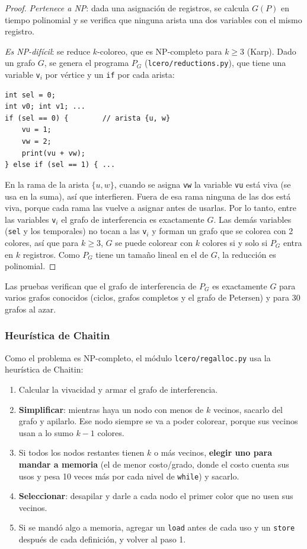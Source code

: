 \documentclass[11pt,a4paper]{article}
\theoremstyle{definition}
\newcommand{\tm}[1]{\texttt{#1}}
\renewcommand{\paragraph}[1]{\subsubsection*{#1}}
\begin{document}
\begin{proof}
\emph{Pertenece a NP}: dada una asignación de registros, se calcula $G(P)$
en tiempo polinomial y se verifica que ninguna arista una dos variables con
el mismo registro.

\emph{Es NP-difícil}: se reduce $k$-coloreo, que es NP-completo para
$k \ge 3$ (Karp). Dado un grafo $G$, se genera el programa $P_G$
(\tm{lcero/reductions.py}), que tiene una variable \tm{v}$_i$ por vértice y
un \tm{if} por cada arista:

\begin{Verbatim}
int sel = 0;
int v0; int v1; ...
if (sel == 0) {        // arista {u, w}
    vu = 1;
    vw = 2;
    print(vu + vw);
} else if (sel == 1) { ...
\end{Verbatim}

En la rama de la arista $\{u, w\}$, cuando se asigna \tm{vw} la variable
\tm{vu} está viva (se usa en la suma), así que interfieren. Fuera de esa
rama ninguna de las dos está viva, porque cada rama las vuelve a asignar
antes de usarlas. Por lo tanto, entre las variables \tm{v}$_i$ el grafo de
interferencia es exactamente $G$. Las demás variables (\tm{sel} y los
temporales) no tocan a las \tm{v}$_i$ y forman un grafo que se colorea con
2 colores, así que para $k \ge 3$, $G$ se puede colorear con $k$ colores si
y solo si $P_G$ entra en $k$ registros. Como $P_G$ tiene un tamaño lineal en
el de $G$, la reducción es polinomial.
\end{proof}

Las pruebas verifican que el grafo de interferencia de $P_G$ es exactamente
$G$ para varios grafos conocidos (ciclos, grafos completos y el grafo de
Petersen) y para 30 grafos al azar.

\paragraph{Heurística de Chaitin}

Como el problema es NP-completo, el módulo \tm{lcero/regalloc.py} usa la
heurística de Chaitin:

\begin{enumerate}
  \item Calcular la vivacidad y armar el grafo de interferencia.
  \item \textbf{Simplificar}: mientras haya un nodo con menos de $k$
  vecinos, sacarlo del grafo y apilarlo. Ese nodo siempre se va a poder
  colorear, porque sus vecinos usan a lo sumo $k-1$ colores.
  \item Si todos los nodos restantes tienen $k$ o más vecinos,
  \textbf{elegir uno para mandar a memoria} (el de menor costo/grado, donde
  el costo cuenta sus usos y pesa 10 veces más por cada nivel de
  \tm{while}) y sacarlo.
  \item \textbf{Seleccionar}: desapilar y darle a cada nodo el primer color
  que no usen sus vecinos.
  \item Si se mandó algo a memoria, agregar un \tm{load} antes de cada uso y
  un \tm{store} después de cada definición, y volver al paso 1.
\end{enumerate}
\end{document}
